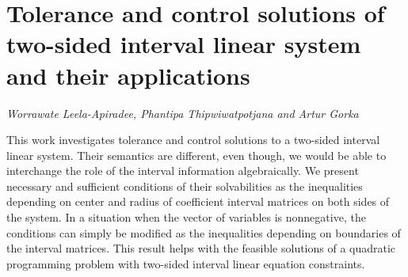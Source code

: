 \documentclass[../booklet.tex]{subfiles}
\begin{document}
\section[Tolerance and control solutions of two-sided interval linear system and their applications. {\it Worrawate Leela-Apiradee, Phantipa Thipwiwatpotjana and Artur Gorka}]{Tolerance and control solutions of two-sided interval linear system and their applications}
  

\begin{center}
  {\it Worrawate Leela-Apiradee, Phantipa Thipwiwatpotjana and Artur Gorka}
\end{center}

\vskip 0.8cm


This work investigates tolerance and control solutions to a two-sided interval linear system. Their semantics are different, even though, we would be able to interchange the role of the interval information algebraically. We present   necessary and sufficient conditions of their solvabilities as the inequalities depending on center and radius of coefficient interval matrices on both sides of the system. In a situation when the vector of variables is nonnegative, the conditions can simply be modified as the inequalities depending on boundaries of the interval matrices. This result helps with the feasible solutions of a quadratic programming problem with two-sided interval linear equation constraints. 



\end{document}
